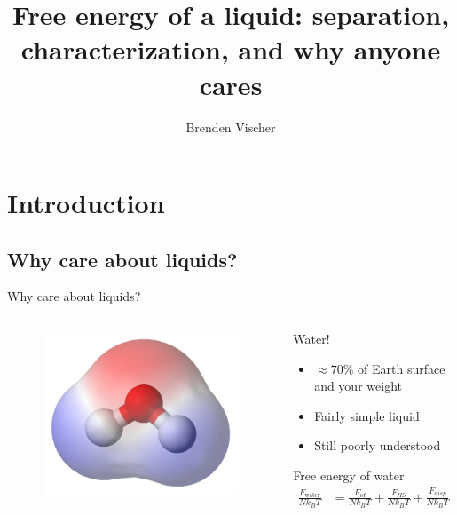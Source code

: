 \documentclass{beamer}
\title[Free energy of a liquid]{Free energy of a liquid: separation, characterization, and why anyone cares}
\author{Brenden Vischer}
\begin{document}


\begin{frame}
	\titlepage
\end{frame}


\section*{Introduction}
\subsection*{Why care about liquids?}
\begin{frame}{Why care about liquids?}
		\begin{columns}[t, onlytextwidth]
			\begin{figure}
				\includegraphics[width=\textwidth]{figs/water.png}	
			\end{figure}
			\begin{block}{Water!}
			\begin{itemize}
				\item $\approx 70\%$ of Earth surface and your weight
				\item Fairly simple liquid
				\item Still poorly understood 
			\end{itemize}

			Free energy of water %
			\begin{align*}
				\frac{F_{\text{water}}}{N k_B T} &= \frac{F_{id}}{N k_B T} + \frac{F_{HS}}{N k_B T} + \frac{F_{disp}}{N k_B T} 
			\end{align*}
			\end{block}
		\end{columns}
\end{frame}
\end{document}

